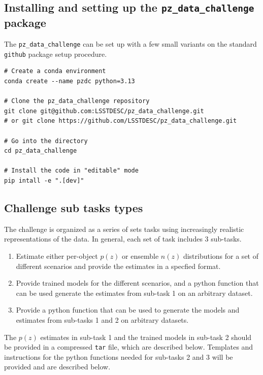 \documentclass[modern]{desc-tex/styles/lsstdescnote}
\begin{document}
\subsection{Installing and setting up the \texttt{pz\_data\_challenge}
  package}

The \texttt{pz\_data\_challenge} can be set up with a few small
variants on the standard \texttt{github} package setup procedure.

\begin{verbatim}
# Create a conda environment
conda create --name pzdc python=3.13

# Clone the pz_data_challenge repository
git clone git@github.com:LSSTDESC/pz_data_challenge.git
# or git clone https://github.com/LSSTDESC/pz_data_challenge.git

# Go into the directory
cd pz_data_challenge

# Install the code in "editable" mode
pip intall -e ".[dev]"
\end{verbatim}


\subsection{Challenge sub tasks types}

The challenge is organized as a series of sets tasks using
increasingly realistic representations of the data.   In general, each
set of task includes 3 sub-tasks.

\begin{enumerate}
  \item{Estimate either per-object $p(z)$ or ensemble $n(z)$
      distributions for a set of different scenarios and provide the
      estimates in a specfied format.}
  \item{Provide trained models for the different scenarios, and a
      python function that can be used generate the estimates from sub-task
      1 on an arbitrary dataset.}    
  \item{Provide a python function that can be used to
      generate the models and estimates from sub-tasks 1 and 2 on
      arbitrary datasets.}
\end{enumerate}

The $p(z)$ estimates in sub-task 1 and the trained models in sub-task 2 should be provided
in a compressed \texttt{tar} file, which are described below.  Templates and instructions for the
python functions needed for sub-tasks 2 and 3 will be provided and are
described below.
\end{document}
